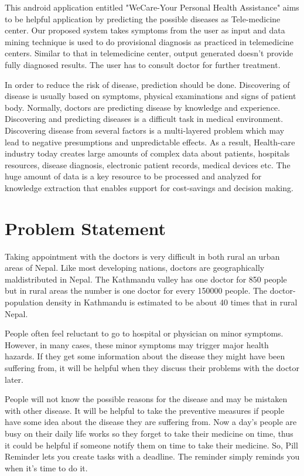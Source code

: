 This android application entitled "WeCare-Your Personal Health Assistance" aims to be helpful application by predicting the possible diseases as Tele-medicine center. Our proposed system takes symptoms from the user as input and data mining technique is used to do provisional diagnosis as practiced in telemedicine centers. Similar to that in telemedicine center, output generated doesn't provide fully diagnosed results. The user has to consult doctor for further treatment.\par
 In  order  to  reduce the risk of disease, prediction should be done. Discovering of disease  is usually based on symptoms, physical examinations and signs of patient body. Normally, doctors are predicting disease by knowledge and experience. Discovering and predicting    diseases  is  a  difficult  task  in  medical  environment. Discovering disease from several factors is a multi-layered problem which may lead to negative presumptions and unpredictable effects. As a result, Health-care  industry  today  creates  large  amounts  of  complex  data  about  patients, hospitals resources, disease diagnosis, electronic patient records, medical devices etc. The huge amount of data is a key resource  to be processed and analyzed for knowledge extraction that enables support for cost-savings and decision making. 

\section{Problem Statement}\label{sec:ps}%
Taking appointment with the doctors is very difficult in both rural an urban areas of Nepal. Like most developing nations, doctors are geographically maldistributed in Nepal. The Kathmandu valley has one doctor for 850 people but in rural areas the number is one doctor for every 150000 people. The doctor-population density in Kathmandu is estimated to be about 40 times that in rural Nepal. \par People often feel reluctant to go to hospital or physician on  minor symptoms.  However, in  many  cases, these  minor symptoms may trigger major health hazards. If they get some information about the disease they might have been suffering from, it will be helpful when they discuss their problems with the doctor later. \par People will not know the possible reasons for the disease and may be mistaken with other disease. It will be helpful to take the preventive measures if people have some idea about the disease they are suffering from. Now a day's people are busy on their daily life works so they forget to take their medicine on time, thus it could be helpful if someone notify them on time to take their medicine. So, Pill Reminder lets you create tasks with a deadline. The reminder simply reminds you when it's time to do it.   
\pagebreak
